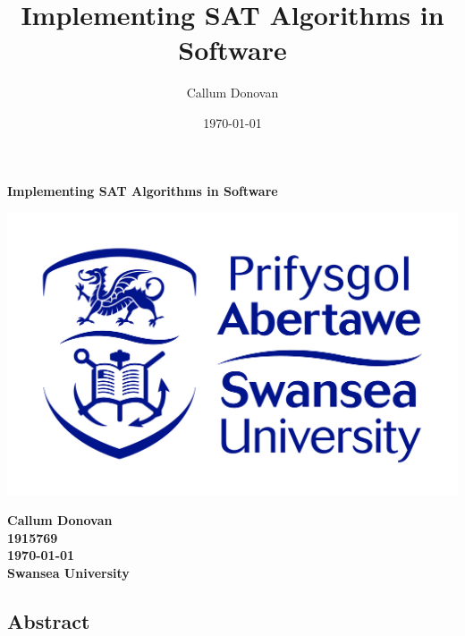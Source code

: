 \documentclass{article}
\title{\bfseries Implementing SAT Algorithms in Software}
\author{Callum Donovan}
\date{ \today }
\begin{document}
\begin{titlepage}
    \begin{center}
        \Large{\bfseries Implementing SAT Algorithms in Software} \\
        \vspace*{\fill}
        \begin{center}
            \includegraphics[scale=0.15]{swan.jpg}
        \end{center}
        \vspace*{\fill}
        \bfseries{\large Callum Donovan \\
            1915769 \\
            \today \\
            Swansea University \\}
    \end{center}
\end{titlepage}

\thispagestyle{empty}
\begin{center}
    \section*{Abstract}
\end{center}
\end{document}
